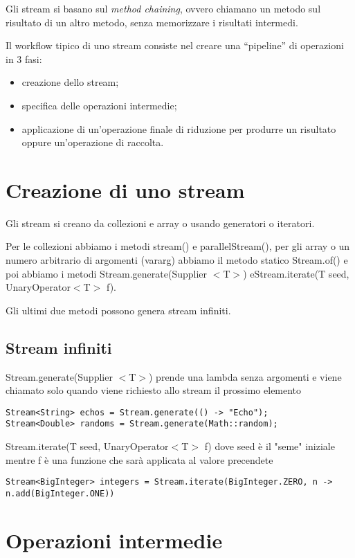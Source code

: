 Gli stream si basano sul \textit{method chaining}, ovvero chiamano un metodo sul risultato di un altro metodo, senza memorizzare i risultati intermedi.

Il workflow tipico di uno stream consiste nel creare una “pipeline” di operazioni in 3 fasi:
\begin{itemize}
    \item creazione dello stream;
    \item specifica delle operazioni intermedie;
    \item applicazione di un’operazione finale di riduzione per produrre un risultato oppure un'operazione di raccolta.
\end{itemize}

\section{Creazione di uno stream}

Gli stream si creano da collezioni e array o usando generatori o iteratori.

Per le collezioni abbiamo i metodi stream() e parallelStream(), per gli array o un numero arbitrario di argomenti (vararg) abbiamo il metodo statico Stream.of() 
e poi abbiamo i metodi Stream.generate(Supplier $<$T$>$) e\newline Stream.iterate(T seed, UnaryOperator$<$T$>$ f).

Gli ultimi due metodi possono genera stream infiniti.

\subsection{Stream infiniti}
Stream.generate(Supplier $<$T$>$) prende una lambda senza argomenti e viene chiamato solo quando viene richiesto allo stream il prossimo elemento
\begin{lstlisting}
Stream<String> echos = Stream.generate(() -> "Echo");
Stream<Double> randoms = Stream.generate(Math::random); 
\end{lstlisting}

Stream.iterate(T seed, UnaryOperator$<$T$>$ f) dove seed è il "seme" iniziale mentre f è una funzione che sarà applicata al valore precendete
\begin{lstlisting}
Stream<BigInteger> integers = Stream.iterate(BigInteger.ZERO, n -> n.add(BigInteger.ONE))   
\end{lstlisting}

\section{Operazioni intermedie}

